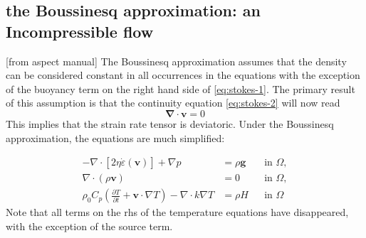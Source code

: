 \subsection{the Boussinesq approximation: an Incompressible flow}


[from aspect manual]
The Boussinesq approximation assumes that the density can be
considered constant in all occurrences in the equations with the exception of
the buoyancy term on the right hand side of \eqref{eq:stokes-1}. The primary
result of this assumption is that the continuity equation \eqref{eq:stokes-2}
will now read
\[
{\bm \nabla}\cdot{\bm v} = 0
\]
This implies that the strain rate tensor is deviatoric.
Under the Boussinesq approximation, the equations are much simplified:

\begin{align}
  \label{eq:stokes-1}
  -\nabla \cdot \left[2\eta \dot\varepsilon(\bm v)
                \right] + \nabla p &=
  \rho \bm g
  &
  & \textrm{in $\Omega$},
  \\
  \label{eq:stokes-2}
  \nabla \cdot (\rho \bm v) &= 0
  &
  & \textrm{in $\Omega$},
  \\
  \label{eq:temperature}
  \rho_0 C_p \left(\frac{\partial T}{\partial t} + \bm v\cdot\nabla T\right)
  - \nabla\cdot k\nabla T
  &=
  \rho H
  &
  & \textrm{in $\Omega$}
\end{align}
Note that all terms on the rhs of the temperature equations have disappeared, with the exception 
of the source term.





